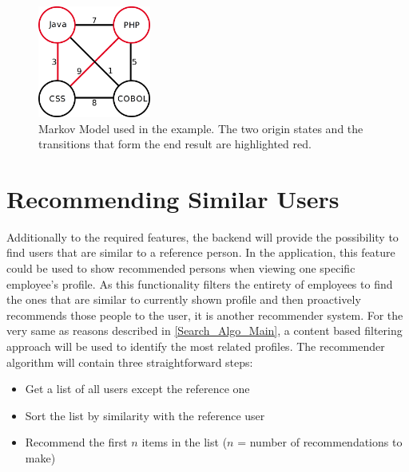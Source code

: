 \begin{figure}[!htp]
    \centering
    \includegraphics[width=0.33\textwidth]{images/markov_impl.png}
    \caption[Diagram: Search Suggestion Markov Model]{Markov Model used in the example. The two origin states and the transitions that form the end result are highlighted red.}
    \label{fig:wireframe}
\end{figure}

\newpage

\section{Recommending Similar Users}
\label{similar}
Additionally to the required features, the backend will provide the possibility to find users that are similar to a reference person.
In the application, this feature could be used to show recommended persons when viewing one specific employee's profile. As this functionality filters the entirety of
employees to find the ones that are similar to currently shown profile and then proactively recommends those people to the user, it is another recommender system.
For the very same as reasons described in \ref{Search_Algo_Main}, a content based filtering approach will be used to identify the most related profiles.
The recommender algorithm will contain three straightforward steps:
\begin{itemize}
	\item Get a list of all users except the reference one
	\item Sort the list by similarity with the reference user
	\item Recommend the first $n$ items in the list ($n$ = number of recommendations to make)
\end{itemize}

